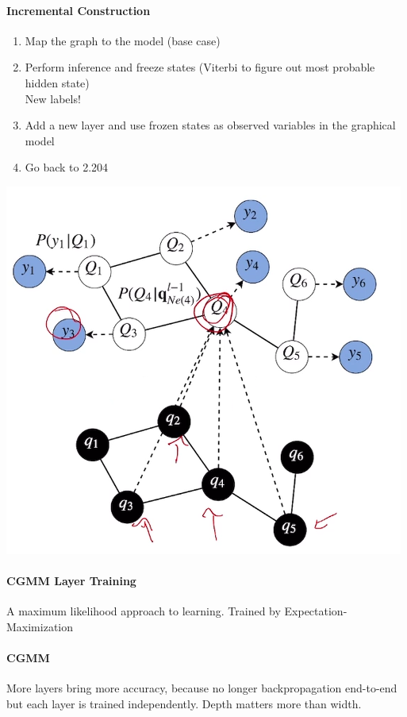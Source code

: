 \documentclass[10pt]{report}
\begin{document}
\paragraph{Incremental Construction} %
\begin{enumerate}
	\item Map the graph to the model (base case)
	\item Perform inference and freeze states (Viterbi to figure out most probable hidden state)\\
	New labels!
	\item Add a new layer and use frozen states as observed variables in the graphical model
	\item Go back to 2.204
\end{enumerate}
\begin{center}
	\includegraphics[scale=0.5]{204.png}
\end{center}
\paragraph{CGMM Layer Training} A maximum likelihood approach to learning.
Trained by Expectation-Maximization

\paragraph{CGMM} More layers bring more accuracy, because no longer backpropagation end-to-end but each layer is trained independently. Depth matters more than width.
\end{document}
